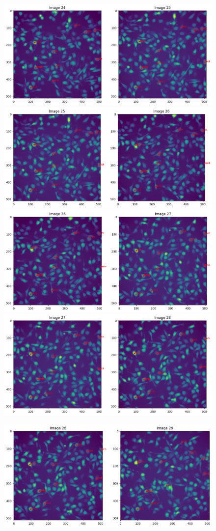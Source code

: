 \documentclass{article}
\begin{document}
\begin{figure}[h!]
\centering
\includegraphics[width=0.75\linewidth]{Report/RImages/Traces_Growth/trace-b25.png}
\includegraphics[width=0.75\linewidth]
{Report/RImages/Traces_Growth/trace-b26.png}
\includegraphics[width=0.75\linewidth]{Report/RImages/Traces_Growth/trace-b27.png}
\includegraphics[width=0.75\linewidth]{Report/RImages/Traces_Growth/trace-b28.png}
\end{figure}


\begin{figure}[h!]
\centering
\includegraphics[width=0.75\linewidth]{Report/RImages/Traces_Growth/trace-b29.png}
\end{figure}
\end{document}
